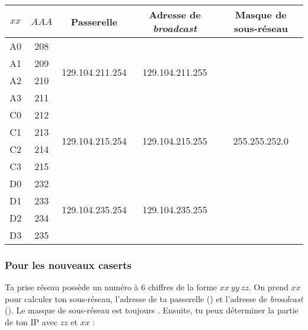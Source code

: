 \begin{center}
\begin{tabular}{|c|c|c|c|c|}
\hline \rule[-3ex]{0pt}{7ex}$xx$ & $AAA$ & \bf Passerelle & \bf Adresse de {\em broadcast} & \bf Masque de sous-réseau \\ 
\hline A0 & 208 & \multirow{4}{*}{129.104.211.254} & \multirow{4}{*}{129.104.211.255} & \multirow{12}{*}{255.255.252.0} \\ 
\cline{1-2} A1 & 209 &  &  &  \\ 
\cline{1-2} A2 & 210 &  &  &  \\ 
\cline{1-2} A3 & 211 &  &  &  \\ 
\cline{1-4}  C0 & 212  & \multirow{4}{*}{129.104.215.254} & \multirow{4}{*}{129.104.215.255} & \\ 
\cline{1-2} C1 & 213 &  &  &  \\ 
\cline{1-2} C2 & 214 &  &  &  \\ 
\cline{1-2} C3 & 215 &  &  &  \\ 
\cline{1-4}  D0 & 232  & \multirow{4}{*}{129.104.235.254} & \multirow{4}{*}{129.104.235.255} & \\ 
\cline{1-2} D1 & 233 &  &  &  \\ 
\cline{1-2} D2 & 234 &  &  &  \\ 
\cline{1-2} D3 & 235 &  &  &  \\ 
\hline
\end{tabular} 
\end{center}



\subsubsection{Pour les nouveaux caserts}

Ta prise r\'eseau poss\`ede un num\'ero \`a 6 chiffres de la forme $xx\ yy\ zz$. On prend $xx$ pour calculer ton sous-r\'eseau, l'adresse de ta passerelle
() et l'adresse de \emph{broadcast} (). Le masque de sous-r\'eseau est toujours
. Ensuite, tu peux d\'eterminer la partie  de ton IP avec $zz$ et $xx$ :


